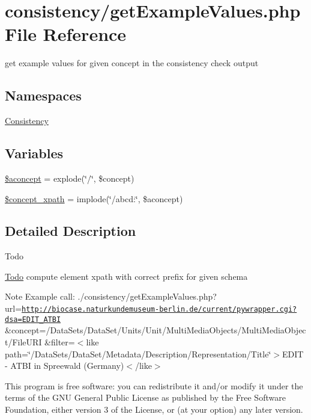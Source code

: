 \hypertarget{get_example_values_8php}{}\section{consistency/get\+Example\+Values.php File Reference}
\label{get_example_values_8php}


get example values for given concept in the consistency check output  


\subsection*{Namespaces}
\begin{DoxyCompactItemize}
\item 
 \hyperlink{namespace_consistency}{Consistency}
\end{DoxyCompactItemize}
\subsection*{Variables}
\begin{DoxyCompactItemize}
\item 
\hyperlink{namespace_consistency_a7ab539c1f2610226e15527ae9f66d1b4}{\$aconcept} = explode(\char`\"{}/\char`\"{}, \$concept)
\item 
\hyperlink{namespace_consistency_a6de4812dd264c558f2dadf3ae20b1da2}{\$concept\+\_\+xpath} = implode(\char`\"{}/abcd\+:\char`\"{}, \$aconcept)
\end{DoxyCompactItemize}


\subsection{Detailed Description}
\begin{DoxyRefDesc}{Todo}
\item[\hyperlink{todo__todo000004}{Todo}]compute element xpath with correct prefix for given schema\end{DoxyRefDesc}


\begin{DoxyNote}{Note}
Example call\+: ./consistency/get\+Example\+Values.php? url=\href{http://biocase.naturkundemuseum-berlin.de/current/pywrapper.cgi?dsa=EDIT_ATBI}{\tt http\+://biocase.\+naturkundemuseum-\/berlin.\+de/current/pywrapper.\+cgi?dsa=\+E\+D\+I\+T\+\_\+\+A\+T\+BI} \&concept=/\+Data\+Sets/\+Data\+Set/\+Units/\+Unit/\+Multi\+Media\+Objects/\+Multi\+Media\+Object/\+File\+U\+RI \&filter=$<$like path=\char`\"{}/\+Data\+Sets/\+Data\+Set/\+Metadata/\+Description/\+Representation/\+Title\char`\"{}$>$E\+D\+IT -\/ A\+T\+BI in Spreewald (Germany)$<$/like$>$
\end{DoxyNote}
This program is free software\+: you can redistribute it and/or modify it under the terms of the G\+NU General Public License as published by the Free Software Foundation, either version 3 of the License, or (at your option) any later version.

